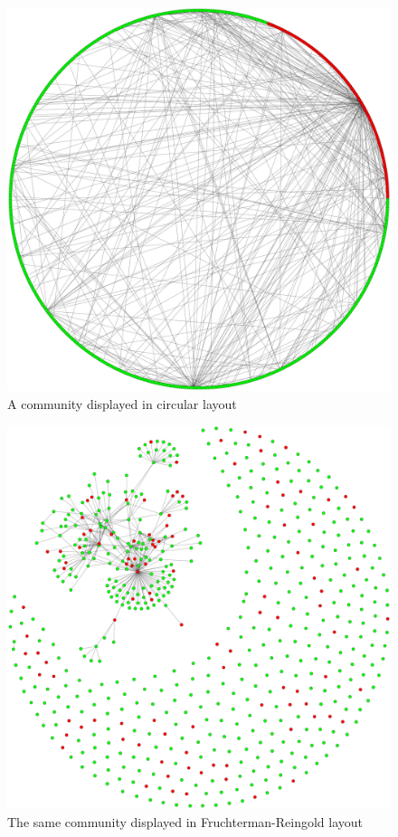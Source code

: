 \documentclass[conference]{IEEEtran}
\begin{document}
\begin{figure}[htbp]
 \centerline{\includegraphics[width=\columnwidth]{community-circular.png}}
 \caption{A community displayed in circular layout}
 \label{fig:communityCircularLayout}
\end{figure}

\begin{figure}[htbp]
 \centerline{\includegraphics[width=\columnwidth]{community_fr.png}}
 \caption{The same community displayed in Fruchterman-Reingold layout}
 \label{fig:communityFRLayout}
\end{figure}
\end{document}
